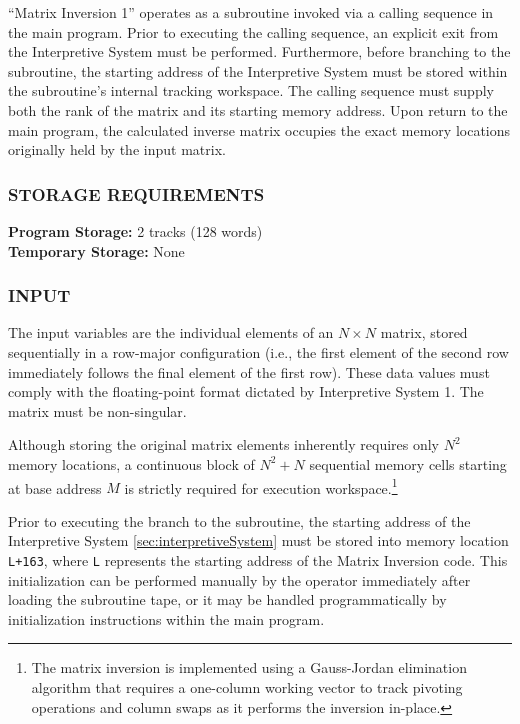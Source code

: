 \documentclass{article}
\begin{document}
``Matrix Inversion 1'' operates as a subroutine invoked via a calling sequence in the main program. Prior to executing the calling sequence, an explicit exit from the Interpretive System must be performed. Furthermore, before branching to the subroutine, the starting address of the Interpretive System must be stored within the subroutine's internal tracking workspace. The calling sequence must supply both the rank of the matrix and its starting memory address. Upon return to the main program, the calculated inverse matrix occupies the exact memory locations originally held by the input matrix.

\subsubsection*{STORAGE REQUIREMENTS}
\noindent
\textbf{Program Storage:} 2 tracks (128 words) \\
\textbf{Temporary Storage:} None

\subsubsection*{INPUT}
The input variables are the individual elements of an $N \times N$ matrix, stored sequentially in a row-major configuration (i.e., the first element of the second row immediately follows the final element of the first row). These data values must comply with the floating-point format dictated by Interpretive System 1. The matrix must be non-singular. 


Although storing the original matrix elements inherently requires only $N^2$ memory locations, a continuous block of $N^2 + N$ sequential memory cells starting at base address $M$ is strictly required for execution workspace.\footnote{The matrix inversion is implemented using a Gauss-Jordan elimination algorithm that requires a one-column working vector to track pivoting operations and column swaps as it performs the inversion in-place.}


Prior to executing the branch to the subroutine, the starting address of the Interpretive System \ref{sec:interpretiveSystem} must be stored into memory location \texttt{L+163}, where \texttt{L} represents the starting address of the Matrix Inversion code. This initialization can be performed manually by the operator immediately after loading the subroutine tape, or it may be handled programmatically by initialization instructions within the main program.
\end{document}
